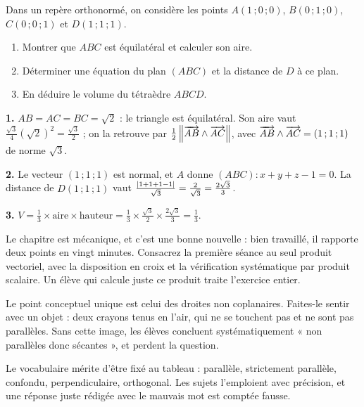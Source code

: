 \begin{concours}
Dans un repère orthonormé, on considère les points $A(1\,;0\,;0)$,
$B(0\,;1\,;0)$, $C(0\,;0\,;1)$ et $D(1\,;1\,;1)$.

\begin{enumerate}[label=\textbf{\arabic*.}, leftmargin=*, itemsep=0.25em]
  \item Montrer que $ABC$ est équilatéral et calculer son aire.
  \item Déterminer une équation du plan $(ABC)$ et la distance de $D$ à ce
        plan.
  \item En déduire le volume du tétraèdre $ABCD$.
\end{enumerate}
\end{concours}

\begin{corrige}
\textbf{1.} $AB = AC = BC = \sqrt2$ : le triangle est équilatéral. Son aire
vaut $\frac{\sqrt3}{4}\left(\sqrt2\right)^{2} = \frac{\sqrt3}{2}$ ; on la
retrouve par $\frac12\left\lVert \overrightarrow{AB} \wedge \overrightarrow{AC} \right\rVert$, avec
$\overrightarrow{AB} \wedge \overrightarrow{AC} = (1\,;1\,;1)$ de norme $\sqrt3$.

\textbf{2.} Le vecteur $(1\,;1\,;1)$ est normal, et $A$ donne
$(ABC) : x+y+z-1 = 0$. La distance de $D(1\,;1\,;1)$ vaut
$\frac{\left|1+1+1-1\right|}{\sqrt3} = \frac{2}{\sqrt3} = \frac{2\sqrt3}{3}$.

\textbf{3.} $V = \frac13 \times \text{aire} \times \text{hauteur}
= \frac13 \times \frac{\sqrt3}{2} \times \frac{2\sqrt3}{3} = \frac13$.
\end{corrige}

\begin{notepourlaclasse}
Le chapitre est mécanique, et c'est une bonne nouvelle : bien travaillé, il
rapporte deux points en vingt minutes. Consacrez la première séance au seul
produit vectoriel, avec la disposition en croix et la vérification
systématique par produit scalaire. Un élève qui calcule juste ce produit
traite l'exercice entier.

Le point conceptuel unique est celui des droites non coplanaires. Faites-le
sentir avec un objet : deux crayons tenus en l'air, qui ne se touchent pas et
ne sont pas parallèles. Sans cette image, les élèves concluent
systématiquement « non parallèles donc sécantes », et perdent la question.

Le vocabulaire mérite d'être fixé au tableau : parallèle, strictement
parallèle, confondu, perpendiculaire, orthogonal. Les sujets l'emploient avec
précision, et une réponse juste rédigée avec le mauvais mot est comptée
fausse.
\end{notepourlaclasse}

